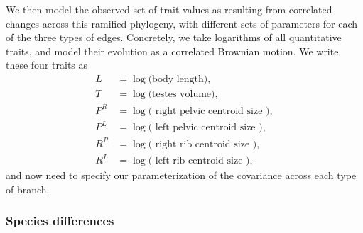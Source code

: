 \documentclass[12pt]{article}
\begin{document}

We then model the observed set of trait values as resulting from correlated changes across this ramified phylogeny,
with different sets of parameters for each of the three types of edges.
Concretely, we take logarithms of all quantitative traits,
and model their evolution as a correlated Brownian motion.
We write these four traits as
\begin{align}
    L &= \log \text{(body length)}, \\
    T &= \log \text{(testes volume)}, \\
    P^R &= \log \text{( right pelvic centroid size )}, \\
    P^L &= \log \text{( left pelvic centroid size )}, \\
    R^R &= \log \text{( right rib centroid size )}, \\
    R^L &= \log \text{( left rib centroid size )},
\end{align}
and now need to specify our parameterization of the covariance across each type of branch.

\subsubsection*{Species differences}
\end{document}
